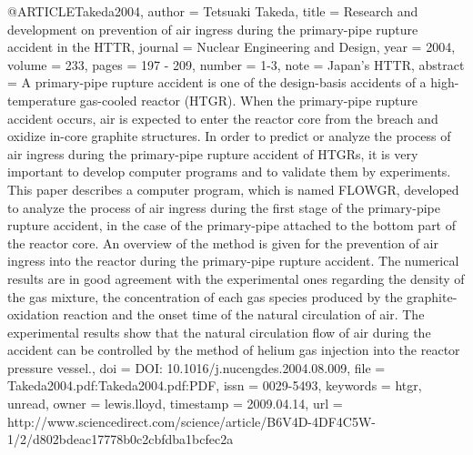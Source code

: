 {{@ARTICLE{Takeda2004,
  author = {Tetsuaki Takeda},
  title = {Research and development on prevention of air ingress during the
	primary-pipe rupture accident in the HTTR},
  journal = {Nuclear Engineering and Design},
  year = {2004},
  volume = {233},
  pages = {197 - 209},
  number = {1-3},
  note = {Japan's HTTR},
  abstract = {A primary-pipe rupture accident is one of the design-basis accidents
	of a high-temperature gas-cooled reactor (HTGR). When the primary-pipe
	rupture accident occurs, air is expected to enter the reactor core
	from the breach and oxidize in-core graphite structures. In order
	to predict or analyze the process of air ingress during the primary-pipe
	rupture accident of HTGRs, it is very important to develop computer
	programs and to validate them by experiments. This paper describes
	a computer program, which is named FLOWGR, developed to analyze the
	process of air ingress during the first stage of the primary-pipe
	rupture accident, in the case of the primary-pipe attached to the
	bottom part of the reactor core. An overview of the method is given
	for the prevention of air ingress into the reactor during the primary-pipe
	rupture accident. The numerical results are in good agreement with
	the experimental ones regarding the density of the gas mixture, the
	concentration of each gas species produced by the graphite-oxidation
	reaction and the onset time of the natural circulation of air. The
	experimental results show that the natural circulation flow of air
	during the accident can be controlled by the method of helium gas
	injection into the reactor pressure vessel.},
  doi = {DOI: 10.1016/j.nucengdes.2004.08.009},
  file = {Takeda2004.pdf:Takeda2004.pdf:PDF},
  issn = {0029-5493},
  keywords = {htgr, unread},
  owner = {lewis.lloyd},
  timestamp = {2009.04.14},
  url = {http://www.sciencedirect.com/science/article/B6V4D-4DF4C5W-1/2/d802bdeac17778b0c2cbfdba1bcfec2a}
}

}}
